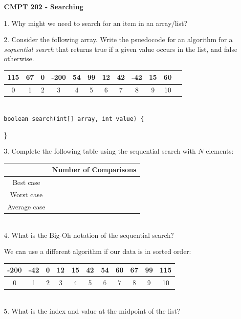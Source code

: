 \documentclass[11pt]{article}
\begin{document}
{\large {\bf CMPT 202 - Searching}} 




1. Why might we need to search for an item in an array/list?
\vspace*{0.5in}

 2. Consider the following array. Write the psuedocode for an algorithm for a {\it sequential search} that returns true if a given value occurs in the list, and false otherwise. \\

\begin{tabular}{|c|c|c|c|c|c|c|c|c|c|c|c|} \hline
115 & 67 & 0 & -200 & 54 & 99 & 12 & 42 & -42 & 15 & 60\\ \hline 
0 & 1 & 2 & 3 & 4 & 5 & 6 & 7 & 8 & 9 & 10 \\ \hline
\end{tabular} \\

{\tt boolean search(int[] array, int value) \{ } \\

\vspace*{1.0in}

\} 

3. Complete the following table using the sequential search with $N$ elements: 


\begin{tabular}{|c|c|} \hline
&   Number of Comparisons  \\ \hline 
Best case &  \\ \hline
Worst case &  \\ \hline
Average case &  \\ \hline
\end{tabular} \\

4. What is the Big-Oh notation of the sequential search?

\noindent
We can use a different algorithm if our data is in sorted order:

\begin{tabular}{|c|c|c|c|c|c|c|c|c|c|c|} \hline
-200 & -42 & 0 & 12 & 15 & 42 & 54 & 60 & 67 & 99 & 115 \\ \hline 
0 & 1 & 2 & 3 & 4 & 5 & 6 & 7 & 8 & 9 & 10 \\ \hline
\end{tabular} \\


5. What is the index and value at the midpoint of the list?
\end{document}
